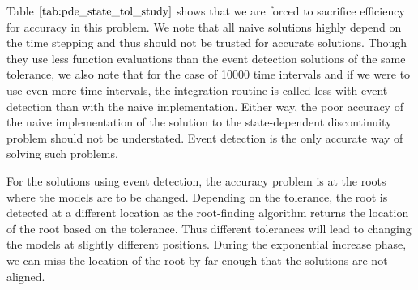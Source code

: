 \documentclass{article}
\begin{document}
Table $\ref{tab:pde_state_tol_study}$ shows that we are forced to sacrifice efficiency for accuracy in this problem. We note that all naive solutions highly depend on the time stepping and thus should not be trusted for accurate solutions. Though they use less function evaluations than the event detection solutions of the same tolerance, we also note that for the case of 10000 time intervals and if we were to use even more time intervals, the integration routine is called less with event detection than with the naive implementation. Either way, the poor accuracy of the naive implementation of the solution to the state-dependent discontinuity problem should not be understated. Event detection is the only accurate way of solving such problems. 

For the solutions using event detection, the accuracy problem is at the roots where the models are to be changed. Depending on the tolerance, the root is detected at a different location as the root-finding algorithm returns the location of the root based on the tolerance. Thus different tolerances will lead to changing the models at slightly different positions. During the exponential increase phase, we can miss the location of the root by far enough that the solutions are not aligned.
\end{document}
